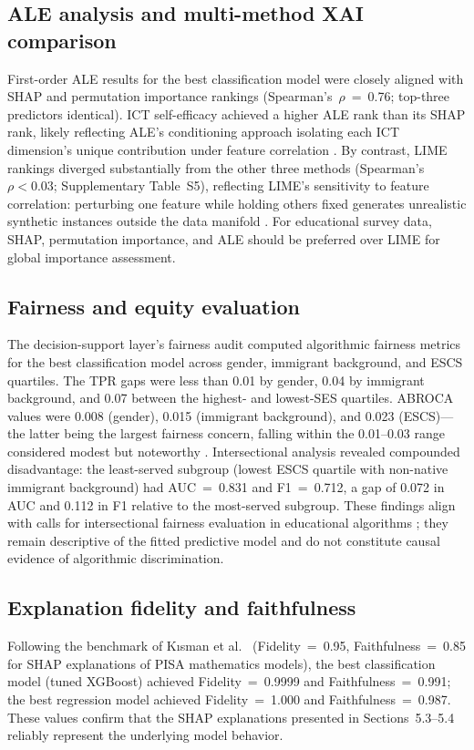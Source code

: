 \FloatBarrier
\subsection{ALE analysis and multi-method XAI comparison}

First-order ALE results for the best classification model were closely aligned with SHAP and permutation importance rankings (Spearman's~$\rho$~=~0.76; top-three predictors identical). ICT self-efficacy achieved a higher ALE rank than its SHAP rank, likely reflecting ALE's conditioning approach isolating each ICT dimension's unique contribution under feature correlation \citep{Molnar_2022,Herbinger_2024_GADGET}. By contrast, LIME rankings diverged substantially from the other three methods (Spearman's~$\rho < 0.03$; Supplementary Table~S5), reflecting LIME's sensitivity to feature correlation: perturbing one feature while holding others fixed generates unrealistic synthetic instances outside the data manifold \citep{Molnar_2022,Niu_2025}. For educational survey data, SHAP, permutation importance, and ALE should be preferred over LIME for global importance assessment.

\FloatBarrier
\subsection{Fairness and equity evaluation}

The decision-support layer's fairness audit computed algorithmic fairness metrics for the best classification model across gender, immigrant background, and ESCS quartiles. The TPR gaps were less than 0.01 by gender, 0.04 by immigrant background, and 0.07 between the highest- and lowest-SES quartiles. ABROCA values were 0.008 (gender), 0.015 (immigrant background), and 0.023 (ESCS)---the latter being the largest fairness concern, falling within the 0.01--0.03 range considered modest but noteworthy \citep{Gandara_2024_blackbox,Verger_2024_MADD}. Intersectional analysis revealed compounded disadvantage: the least-served subgroup (lowest ESCS quartile with non-native immigrant background) had AUC~=~0.831 and F1~=~0.712, a gap of 0.072 in AUC and 0.112 in F1 relative to the most-served subgroup. These findings align with calls for intersectional fairness evaluation in educational algorithms \citep{Idowu_2024_debiasing,Verger_2024_MADD}; they remain descriptive of the fitted predictive model and do not constitute causal evidence of algorithmic discrimination.

\FloatBarrier
\subsection{Explanation fidelity and faithfulness}

Following the benchmark of K{\i}sman et al.\ \citep{Kisman_2026} (Fidelity~=~0.95, Faithfulness~=~0.85 for SHAP explanations of PISA mathematics models), the best classification model (tuned XGBoost) achieved Fidelity~=~0.9999 and Faithfulness~=~0.991; the best regression model achieved Fidelity~=~1.000 and Faithfulness~=~0.987. These values confirm that the SHAP explanations presented in Sections~5.3--5.4 reliably represent the underlying model behavior.

\FloatBarrier

